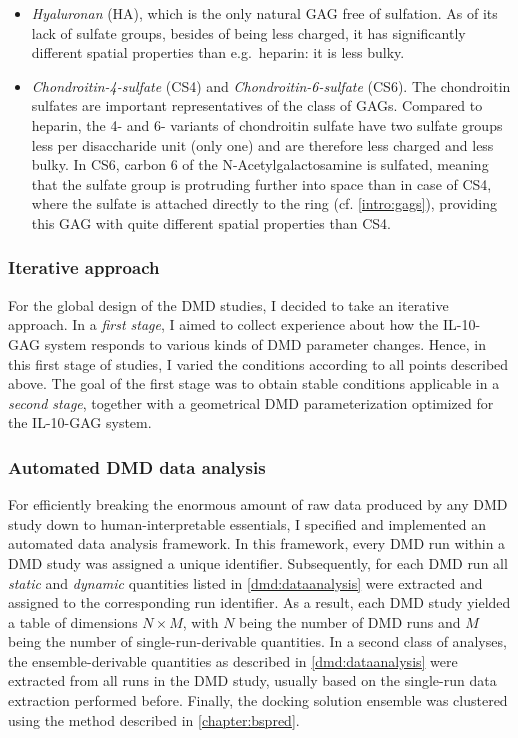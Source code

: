 \begin{itemize}
\begin{itemize}
\item \textit{Hyaluronan} (HA), which is the only natural GAG free of sulfation.
As of its lack of sulfate groups, besides of being less charged, it has
significantly different spatial properties than e.g.\ heparin: it is less bulky.

\item \textit{Chondroitin-4-sulfate} (CS4) and \textit{Chondroitin-6-sulfate}
(CS6). The chondroitin sulfates are important representatives of the class of
GAGs. Compared to heparin, the 4- and 6- variants of chondroitin sulfate have
two sulfate groups less per disaccharide unit (only one) and are therefore less
charged and less bulky. In CS6, carbon 6 of the N-Acetyl\-ga\-lacto\-sa\-mine is
sulfated, meaning that the sulfate group is protruding further into space than
in case of CS4, where the sulfate is attached directly to the ring (cf.
\cref{intro:gags}), providing this GAG with quite different spatial properties
than CS4.

\end{itemize}

\end{itemize}

\subsubsection{Iterative approach}

For the global design of the DMD studies, I decided to take an iterative
approach. In a \textit{first stage}, I aimed to collect experience about how the
IL-10-GAG system responds to various kinds of DMD parameter changes. Hence, in
this first stage of studies, I varied the conditions according to all points
described above. The goal of the first stage was to obtain stable conditions
applicable in a \textit{second stage}, together with a geometrical DMD
parameterization optimized for the IL-10-GAG system.


\subsubsection{Automated DMD data analysis}

For efficiently breaking the enormous amount of raw data produced by any DMD
study down to human-interpretable essentials, I specified and implemented an
automated data analysis framework. In this framework, every DMD run within a DMD
study was assigned a unique identifier. Subsequently, for each DMD run all
\textit{static} and \textit{dynamic} quantities listed in
\cref{dmd:dataanalysis} were extracted and assigned to the corresponding run
identifier. As a result, each DMD study yielded a table of dimensions $N \times
M$, with $N$ being the number of DMD runs and $M$ being the number of
single-run-derivable quantities. In a second class of analyses, the
ensemble-derivable quantities as described in \cref{dmd:dataanalysis} were
extracted from all runs in the DMD study, usually based on the single-run data
extraction performed before. Finally, the docking solution ensemble was
clustered using the method described in \cref{chapter:bspred}.

